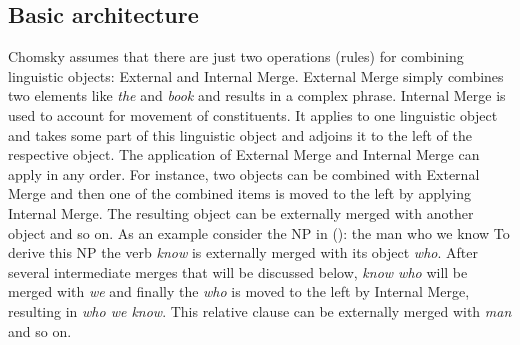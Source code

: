 \subsection{Basic architecture}

Chomsky assumes that there are just two operations (rules) for combining linguistic objects:
External and Internal Merge. External Merge simply combines two elements like \emph{the} and
\emph{book} and results in a complex phrase. Internal Merge is used to account for movement of
constituents. It applies to one linguistic object and takes some part of this linguistic object and
adjoins it to the left of the respective object. The application of External Merge and Internal
Merge can apply in any order. For instance, two objects can be combined with External Merge and then
one of the combined items is moved to the left by applying Internal Merge. The resulting object can
be externally merged with another object and so on. As an example consider the NP in ():
\ea
the man who we know
\z
To derive this NP the verb \emph{know} is externally merged with its object \emph{who}. After
several intermediate merges that will be discussed below, \emph{know who} will be merged with
\emph{we} and finally the \emph{who} is moved to the left by Internal Merge, resulting in \emph{who
  we know}. This relative clause can be externally merged with \emph{man} and so on.

